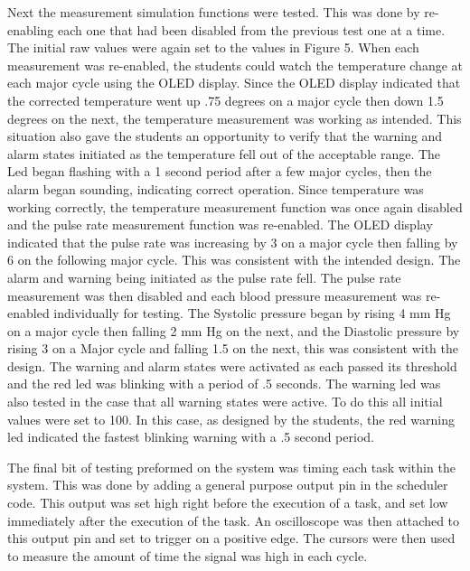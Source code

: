 \documentclass[12pt]{article} %
\begin{document}
    Next the measurement simulation functions were tested. This was done by
    re-enabling each one that had been disabled from the previous test one at a
    time. The initial raw values were again set to the values in Figure 5. When
    each measurement was re-enabled, the students could watch the temperature change
    at each major cycle using the OLED display. Since the OLED display indicated
    that the corrected temperature went up .75 degrees on a major cycle then down
    1.5 degrees on the next, the temperature measurement was working as intended.
    This situation also gave the students an opportunity to verify that the warning
    and alarm states initiated as the temperature fell out of the acceptable range.
    The Led began flashing with a 1 second period after a few major cycles, then
    the alarm began sounding, indicating correct operation. Since temperature was
    working correctly, the temperature measurement function was once again disabled
    and the pulse rate measurement function was re-enabled. The OLED display
    indicated that the pulse rate was increasing by 3 on a major cycle then falling
    by 6 on the following major cycle. This was consistent with the intended
    design. The alarm and warning being initiated as the pulse rate fell. The pulse
    rate measurement was then disabled and each blood pressure measurement was
    re-enabled individually for testing. The Systolic pressure began by rising 4 mm
    Hg on a major cycle then falling 2 mm Hg on the next, and the Diastolic
    pressure by rising 3 on a Major cycle and falling 1.5 on the next, this was
    consistent with the design. The warning and alarm states were activated as each
    passed its threshold and the red led was blinking with a period of .5 seconds.
    The warning led was also tested in the case that all warning states were
    active. To do this all initial values were set to 100. In this case, as
    designed by the students, the red warning led indicated the fastest blinking
    warning with a .5 second period. 

    The final bit of testing preformed on the system was timing each task within
    the system. This was done by adding a general purpose output pin in the
    scheduler code. This output was set high right before the execution of a task,
    and set low immediately after the execution of the task. An oscilloscope was
    then attached to this output pin and set to trigger on a positive edge. The
    cursors were then used to measure the amount of time the signal was high in
    each cycle.
\end{document}
